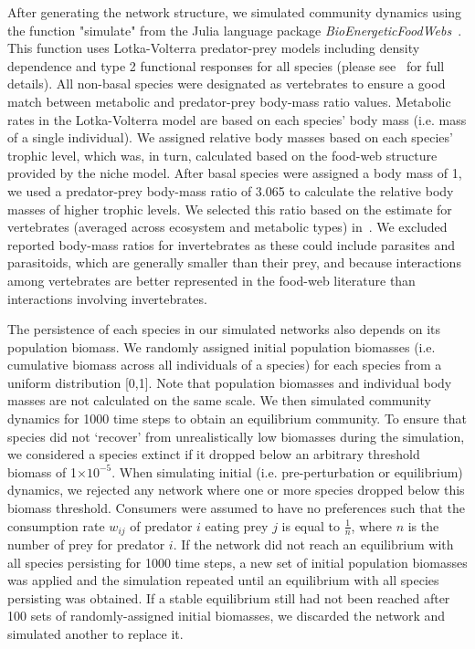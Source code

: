 \documentclass[12pt]{article}
\begin{document}
  
    		After generating the network structure, we simulated community dynamics using the function "simulate" from the Julia language package \emph{BioEnergeticFoodWebs}~\citep{bioenergeticfw,Delmas2017}. This function uses Lotka-Volterra predator-prey models including density dependence and type 2 functional responses for all species (please see~\citet{Delmas2017} for full details).
    		All non-basal species were designated as vertebrates to ensure a good match between metabolic and predator-prey body-mass ratio values. Metabolic rates in the Lotka-Volterra model are based on each species' body mass (i.e. mass of a single individual). We assigned relative body masses based on each species' trophic level, which was, in turn, calculated based on the food-web structure provided by the niche model. After basal species were assigned a body mass of 1, we used a predator-prey body-mass ratio of 3.065 to calculate the relative body masses of higher trophic levels. We selected this ratio based on the estimate for vertebrates (averaged across ecosystem and metabolic types) in~\citet{Brose2006}. We excluded reported body-mass ratios for invertebrates as these could include parasites and parasitoids, which are generally smaller than their prey, and because interactions among vertebrates are better represented in the food-web literature than interactions involving invertebrates.
    		
    		
    		The persistence of each species in our simulated networks also depends on its population biomass. 
    		We randomly assigned initial population biomasses (i.e. cumulative biomass across all individuals of a species) for each species from a uniform distribution [0,1]. Note that population biomasses and individual body masses are not calculated on the same scale. We then simulated community dynamics for 1000 time steps to obtain an equilibrium community. To ensure that species did not `recover' from unrealistically low biomasses during the simulation, we considered a species extinct if it dropped below an arbitrary threshold biomass of 1$\times10^{-5}$. When simulating initial (i.e. pre-perturbation or equilibrium) dynamics, we rejected any network where one or more species dropped below this biomass threshold. Consumers were assumed to have no preferences such that the consumption rate $w_{ij}$ of predator $i$ eating prey $j$ is equal to $\frac{1}{n}$, where $n$ is the number of prey for predator $i$. If the network did not reach an equilibrium with all species persisting for 1000 time steps, a new set of initial population biomasses was applied and the simulation repeated until an equilibrium with all species persisting was obtained.
    		If a stable equilibrium still had not been reached after 100 sets of randomly-assigned initial biomasses, we discarded the network and simulated another to replace it.
    
\end{document}
